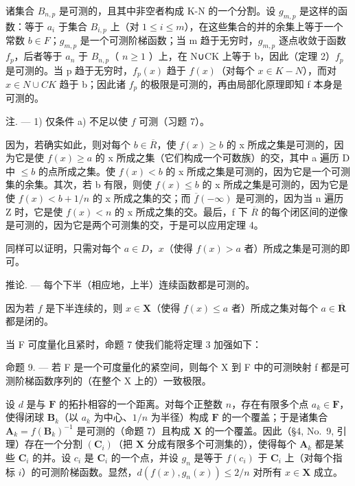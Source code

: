 诸集合 \(B_{n,p}\) 是可测的，且其中非空者构成 K-N 的一个分割。设 \(g_{m,p}\) 是这样的函数：等于 \(a_{i}\) 于集合 \(B_{i,p}\) 上（对 \(1 \leqslant i \leqslant m\)），在这些集合的并的余集上等于一个常数 \(b \in F\)；\(g_{m,p}\) 是一个可测阶梯函数；当 m 趋于无穷时，\(g_{m,p}\) 逐点收敛于函数 \(f_{p}\)，后者等于 \(a_{n}\) 于 \(B_{n,p}\)（ \(n \geqslant 1\) ）上，在 N∪CK 上等于 b，因此（定理 2）\(f_{p}\) 是可测的。当 p 趋于无穷时，\(f_{p}(x)\) 趋于 \(f(x)\)（对每个 \(x \in K-N\)），而对 \(x \in N \cup CK\) 趋于 b；因此诸 \(f_{p}\) 的极限是可测的，再由局部化原理即知 f 本身是可测的。

注. --- 1) 仅条件 a) 不足以使 \(f\) 可测（习题 7）。

因为，若确实如此，则对每个 \(b \in \overline{R}\)，使 \(f(x) \geqslant b\) 的 x 所成之集是可测的，因为它是使 \(f(x) \geqslant a\) 的 x 所成之集（它们构成一个可数族）的交，其中 a 遍历 D 中 \(\leqslant b\) 的点所成之集。使 \(f(x) < b\) 的 x 所成之集是可测的，因为它是一个可测集的余集。其次，若 b 有限，则使 \(f(x) \leqslant b\) 的 x 所成之集是可测的，因为它是使 \(f(x) < b + 1/n\) 的 x 所成之集的交；而 \(\overline{f}(-\infty)\) 是可测的，因为当 n 遍历 Z 时，它是使 \(f(x) < n\) 的 x 所成之集的交。最后，f 下 \(\overline{R}\) 的每个闭区间的逆像是可测的，因为它是两个可测集的交，于是可以应用定理 4。

同样可以证明，只需对每个 \(a \in D\)，\(x\)（使得 \(f(x) > a\) 者）所成之集是可测的即可。

推论. --- 每个下半（相应地，上半）连续函数都是可测的。

因为若 \(f\) 是下半连续的，则 \(x \in \mathbf{X}\)（使得 \(f(x) \leqslant a\) 者）所成之集对每个 \(a \in \overline{\mathbf{R}}\) 都是闭的。

当 F 可度量化且紧时，命题 7 使我们能将定理 3 加强如下：

命题 9. --- 若 F 是一个可度量化的紧空间，则每个 X 到 F 中的可测映射 f 都是可测阶梯函数序列的（在整个 X 上的）一致极限。

设 \(d\) 是与 \(\mathbf{F}\) 的拓扑相容的一个距离。对每个正整数 \(n\)，存在有限多个点 \(a_{k} \in \mathbf{F}\)，使得闭球 \(\mathbf{B}_{k}\)（以 \(a_{k}\) 为中心、\(1/n\) 为半径）构成 \(\mathbf{F}\) 的一个覆盖；于是诸集合 \(\mathbf{A}_{k} = f(\mathbf{B}_{k})^{-1}\) 是可测的（命题 7）且构成 \(\mathbf{X}\) 的一个覆盖。因此（§4, No.~9, 引理）存在一个分割 \((\mathbf{C}_{i})\)（把 \(\mathbf{X}\) 分成有限多个可测集的），使得每个 \(\mathbf{A}_{k}\) 都是某些 \(\mathbf{C}_{i}\) 的并。设 \(c_{i}\) 是 \(\mathbf{C}_{i}\) 的一个点，并设 \(g_{n}\) 是等于 \(f(c_{i})\) 于 \(\mathbf{C}_{i}\) 上（对每个指标 \(i\)）的可测阶梯函数。显然，\(d(f(x), g_{n}(x)) \leqslant 2/n\) 对所有 \(x \in \mathbf{X}\) 成立。

